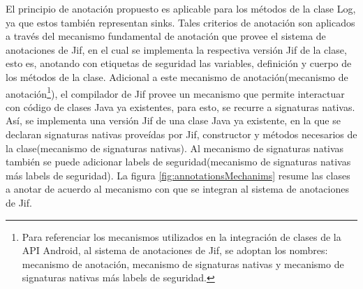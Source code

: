 El principio de anotación propuesto es aplicable para los métodos de la clase
Log, ya que estos también representan sinks.\newline 
Tales criterios de anotación son aplicados a través del mecanismo fundamental de
anotación que provee el sistema de anotaciones de Jif, en el cual se implementa
la respectiva versión Jif de la clase, esto es, anotando con etiquetas de
seguridad las variables, definición y cuerpo de los métodos de la clase.
Adicional a este mecanismo de anotación(mecanismo de
anotación\footnote{Para referenciar los mecanismos utilizados en la integración
de clases de la API Android, al sistema de anotaciones de Jif, se adoptan los
nombres: mecanismo de anotación, mecanismo de signaturas nativas y mecanismo de
signaturas nativas más labels de seguridad.}), el compilador de Jif provee un
mecanismo que permite interactuar con código de clases Java ya
existentes\cite{annotations-Jif}, para esto, se recurre a signaturas nativas.
Así, se implementa una versión Jif de una clase Java ya existente, en la que se
declaran signaturas nativas proveídas por Jif, constructor y métodos necesarios
de la clase(mecanismo de signaturas nativas).
Al mecanismo de signaturas nativas también se puede  adicionar labels de
seguridad(mecanismo de signaturas nativas más labels de seguridad).\newline 
La figura \ref{fig:annotationsMechanims} resume las clases a anotar de acuerdo
al mecanismo con que se integran al sistema de anotaciones de Jif.

